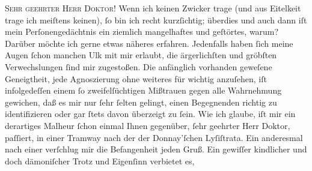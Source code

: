 \pstart{}\textsc{Sehr geehrter Herr Doktor!}\pend\vspace{0.5em}
\pstart
           Wenn ich keinen Zwicker trage (und aus Eitelkeit trage ich meiſtens keinen),{ }ſo bin
               ich recht kurzſichtig; überdies und auch dann iſt mein Perſonengedächtnis ein
               ziemlich mangelhaftes und geſtörtes, warum? Darüber möchte ich gerne etwas näheres
               erfahren. Jedenfalls haben{ }ſich meine Augen{ }ſchon manchen Ulk mit mir erlaubt, die
               ärgerlichſten und gröbſten Verwechslungen{ }ſind mir zugestoßen. Die anfänglich
               vorhanden geweſene Geneigtheit, jede Agnoszierung ohne weiteres für wichtig
               anzuſehen, iſt infolgedeſſen einem{ }ſo zweifelſüchtigen Mißtrauen gegen alle
               Wahrnehmung gewichen, daß es mir nur{ }ſehr{ }ſelten gelingt, einen Begegnenden richtig
               zu identifizieren oder gar{ }ſtets davon überzeigt zu{ }ſein. Wie ich glaube, iſt mir ein
               derartiges Malheur{ }ſchon einmal Ihnen gegenüber,{ }ſehr geehrter \introOben{}Herr\introOben{} Doktor, paſſiert, in einer Tramway nach der \label{K_L01840-1v}\label{K_L01840-1}
               der Donnay’ſchen {\pb}Lyſiſtrata. Ein anderesmal nach einer \label{K_L01840-2v}\label{K_L01840-2} verſchlug mir die Befangenheit jeden
               Gruß. Ein gewiſſer kindlicher und doch dämoniſcher Trotz und Eigenſinn verbietet es,
